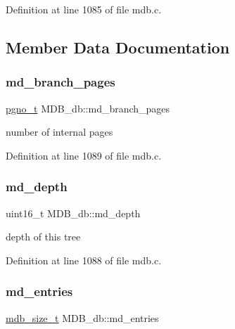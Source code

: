 Definition at line 1085 of file mdb.\+c.



\subsection{Member Data Documentation}
\mbox{\label{struct_m_d_b__db_a656181db923d8349e54d051282e09ad3}} 
\subsubsection{\texorpdfstring{md\+\_\+branch\+\_\+pages}{md\_branch\_pages}}
{\footnotesize\ttfamily \mbox{\hyperlink{group__internal_gadb65f0424c9d3827bf6409087ad555cd}{pgno\+\_\+t}} M\+D\+B\+\_\+db\+::md\+\_\+branch\+\_\+pages}

number of internal pages 

Definition at line 1089 of file mdb.\+c.

\mbox{\label{struct_m_d_b__db_a972437b5350a9306b3e0d6d315b3456a}} 
\subsubsection{\texorpdfstring{md\+\_\+depth}{md\_depth}}
{\footnotesize\ttfamily uint16\+\_\+t M\+D\+B\+\_\+db\+::md\+\_\+depth}

depth of this tree 

Definition at line 1088 of file mdb.\+c.

\mbox{\label{struct_m_d_b__db_a4e29b63b778a67c89a3366c65ef312fa}} 
\subsubsection{\texorpdfstring{md\+\_\+entries}{md\_entries}}
{\footnotesize\ttfamily \mbox{\hyperlink{lmdb_8h_a78821971e612e3898ef4b3ae45ed86f1}{mdb\+\_\+size\+\_\+t}} M\+D\+B\+\_\+db\+::md\+\_\+entries}

